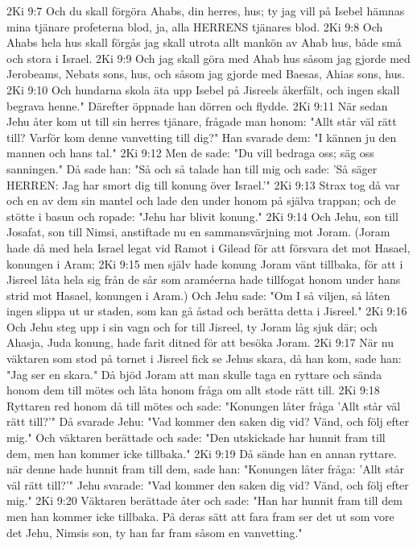 2Ki 9:7  Och du skall förgöra Ahabs, din herres, hus; ty jag vill på Isebel hämnas mina tjänare profeterna blod, ja, alla HERRENS tjänares blod.
2Ki 9:8  Och Ahabs hela hus skall förgås jag skall utrota allt mankön av Ahab hus, både små och stora i Israel.
2Ki 9:9  Och jag skall göra med Ahab hus såsom jag gjorde med Jerobeams, Nebats sons, hus, och såsom jag gjorde med Baesas, Ahias sons, hus.
2Ki 9:10  Och hundarna skola äta upp Isebel på Jisreels åkerfält, och ingen skall begrava henne." Därefter öppnade han dörren och flydde.
2Ki 9:11  När sedan Jehu åter kom ut till sin herres tjänare, frågade man honom: "Allt står väl rätt till? Varför kom denne vanvetting till dig?" Han svarade dem: "I kännen ju den mannen och hans tal."
2Ki 9:12  Men de sade: "Du vill bedraga oss; säg oss sanningen." Då sade han: "Så och så talade han till mig och sade: 'Så säger HERREN: Jag har smort dig till konung över Israel.'"
2Ki 9:13  Strax tog då var och en av dem sin mantel och lade den under honom på själva trappan; och de stötte i basun och ropade: "Jehu har blivit konung."
2Ki 9:14  Och Jehu, son till Josafat, son till Nimsi, anstiftade nu en sammansvärjning mot Joram. (Joram hade då med hela Israel legat vid Ramot i Gilead för att försvara det mot Hasael, konungen i Aram;
2Ki 9:15  men själv hade konung Joram vänt tillbaka, för att i Jisreel låta hela sig från de sår som araméerna hade tillfogat honom under hans strid mot Hasael, konungen i Aram.) Och Jehu sade: "Om I så viljen, så låten ingen slippa ut ur staden, som kan gå åstad och berätta detta i Jisreel."
2Ki 9:16  Och Jehu steg upp i sin vagn och for till Jisreel, ty Joram låg sjuk där; och Ahasja, Juda konung, hade farit ditned för att besöka Joram.
2Ki 9:17  När nu väktaren som stod på tornet i Jisreel fick se Jehus skara, då han kom, sade han: "Jag ser en skara." Då bjöd Joram att man skulle taga en ryttare och sända honom dem till mötes och låta honom fråga om allt stode rätt till.
2Ki 9:18  Ryttaren red honom då till mötes och sade: "Konungen låter fråga 'Allt står väl rätt till?'" Då svarade Jehu: "Vad kommer den saken dig vid? Vänd, och följ efter mig." Och väktaren berättade och sade: "Den utskickade har hunnit fram till dem, men han kommer icke tillbaka."
2Ki 9:19  Då sände han en annan ryttare. när denne hade hunnit fram till dem, sade han: "Konungen låter fråga: 'Allt står väl rätt till?'" Jehu svarade: "Vad kommer den saken dig vid? Vänd, och följ efter mig."
2Ki 9:20  Väktaren berättade åter och sade: "Han har hunnit fram till dem men han kommer icke tillbaka. På deras sätt att fara fram ser det ut som vore det Jehu, Nimsis son, ty han far fram såsom en vanvetting."
